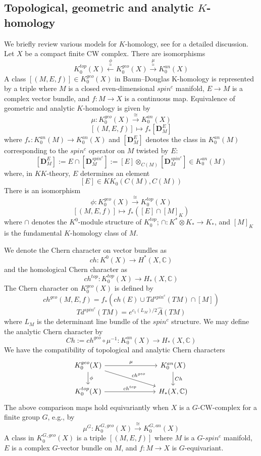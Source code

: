 \documentclass[11pt,leqno,twoside]{amsart}
\theoremstyle{plainsl}
\theoremstyle{definition}
\newcommand{\bD}{\mathbf{D}}
\begin{document}
\subsection{Topological, geometric and analytic $K$-homology}
\label{compairsonmaps}
We briefly review  various models for $K$-homology, see \cite{A,ABP1} for a detailed discussion. Let  $X$ be a compact finite CW complex.  There are isomorphisms
\[
 K_0^{top}(X)
\xleftarrow{\underset{\cong}{\phi}}
K_0^{geo}(X)
\xrightarrow{\underset{\cong}{\mu}}
K_0^{an}(X)
\]
A class $[(M,E,f)]\in K_0^{geo}(X)$ in Baum–Douglas K-homology \cite{BD} is represented by a triple where $M$ is a closed even-dimensional $spin^c$ manifold, $E\rightarrow M$ is a complex vector bundle, and $f:M\rightarrow X$ is a continuous map. Equivalence of geometric and analytic $K$-homology \cite{BHS} is given by 
\[\mu:K_0^{geo}(X) \xrightarrow{\cong} K_0^{an}(X) \]
\[[(M,E,f)]\mapsto f_*[\bD_M^E]\] 
where $f_*:K_0^{an}(M) \rightarrow K_0^{an}(X)$ and $[\bD_M^E]$ denotes the  class in $K_0^{an}(M)$ corresponding to the  $spin^c$ operator on $M$ twisted by $E$:
\[[\bD_M^E]:=E\cap[\bD_M^{spin^c}]:=[E]\otimes_{C(M)}[\bD_M^{spin^c}] \in K_0^{an}(M)\]
where, in $KK$-theory, $E$ determines an element
\[
[E]\in KK_0(C(M),C(M))
\]
There is an isomorphism 
\[\phi:K_0^{geo}(X) \xrightarrow{\cong} K_0^{top}(X) \]
\[[(M,E,f)]\mapsto f_*([E]\cap [M]_K)\]
where $\cap$ denotes the $K^0$-module structure of $K^{top}_0$; $\cap:K^* \otimes K_*\rightarrow K_*$, and $[M]_K$ is the fundamental $K$-homology class of $M$.

We denote the Chern character on vector bundles as
\[ch:K^0(X)\rightarrow H^*(X,\mathbb{C})\] and the homological Chern character \cite{BFM2} as
\[ch^{top}:K_0^{top}(X)\rightarrow H_*(X,\mathbb{C})\]
The Chern character on $K_0^{geo}(X)$ is defined by \cite[\S~2.6]{BE}
\[ch^{geo}(M,E,f)=f_*(ch(E)\cup Td^{spin^c}(TM)\cap [M])\]
\[Td^{spin^c}(TM)=e^{c_1(L_{M})/2}\hat{A}(TM)\]
where $L_{M}$ is the determinant line bundle of the $spin^c$ structure. We may define the analytic Chern character by  \cite[\S~2.6]{BE}
\[Ch:=ch^{geo}\circ\mu^{-1}:K_0^{an}(X) \rightarrow  H_*(X,\mathbb{C})\]
 We have the compatibility of topological and analytic Chern characters
\begin{equation}\label{compatiblitcherntodd2}
\begin{tikzcd}
K_0^{geo}(X)
    \arrow[d, "\phi"]
    \arrow[rrr, "\mu"]
    \arrow[drrr, "ch^{geo}"]
&&&
K_0^{an}(X)
    \arrow[d, "Ch"]
\\
K_0^{top}(X)
    \arrow[rrr, "ch^{top}"]
&&&
H_*(X,\mathbb{C})
\end{tikzcd}
\end{equation}
The above comparison maps hold equivariantly when $X$ is a $G$-CW-complex for a finite group $G$, e.g., by \cite{BOSW} 
\begin{equation}\label{equicompare}
    \mu^G:K_0^{G,geo}(X) \xrightarrow{\cong} K_0^{G,an}(X) 
\end{equation}
A class in $K_0^{G,geo}(X)$ is a triple $[(M,E,f)]$ where $M$ is a $G$-$spin^c$ manifold, $E$ is a complex $G$-vector bundle on $M$, and $f:M\rightarrow X$ is $G$-equivariant.
\end{document}
